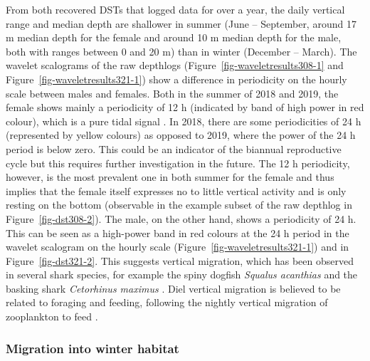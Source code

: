 \documentclass[
  authoryear,
  review,
  3p]{elsarticle}
\begin{document}
From both recovered DSTs that logged data for over a year, the daily
vertical range and median depth are shallower in summer (June --
September, around 17 m median depth for the female and around 10 m
median depth for the male, both with ranges between 0 and 20 m) than in
winter (December -- March). The wavelet scalograms of the raw depthlogs
(Figure~\ref{fig-waveletresults308-1} and
Figure~\ref{fig-waveletresults321-1}) show a difference in periodicity
on the hourly scale between males and females. Both in the summer of
2018 and 2019, the female shows mainly a periodicity of 12 h (indicated
by band of high power in red colour), which is a pure tidal signal
\citep[since from one high tide to the next one it takes approximately
12 h, the same holds true for low tide,][]{shepard_2006}. In 2018, there
are some periodicities of 24 h (represented by yellow colours) as
opposed to 2019, where the power of the 24 h period is below zero. This
could be an indicator of the biannual reproductive cycle \citep[with
females feeding when they are not pregnant, and they stop feeding during
the migration to parturition grounds and parturition
itself,][p.~23]{michael_2006} but this requires further investigation in
the future. The 12 h periodicity, however, is the most prevalent one in
both summer for the female and thus implies that the female itself
expresses no to little vertical activity and is only resting on the
bottom (observable in the example subset of the raw depthlog in
Figure~\ref{fig-dst308-2}). The male, on the other hand, shows a
periodicity of 24 h. This can be seen as a high-power band in red
colours at the 24 h period in the wavelet scalogram on the hourly scale
(Figure~\ref{fig-waveletresults321-1}) and in Figure~\ref{fig-dst321-2}.
This suggests vertical migration, which has been observed in several
shark species, for example the spiny dogfish \emph{Squalus acanthias}
\citep{carlson_2014} and the basking shark \emph{Cetorhinus maximus}
\citep{shepard_2006}. Diel vertical migration is believed to be related
to foraging and feeding, following the nightly vertical migration of
zooplankton to feed \citep{griffiths_2020}.

\hypertarget{sec-disc-wintermig}{%
\subsubsection{Migration into winter habitat}\label{sec-disc-wintermig}}
\end{document}

